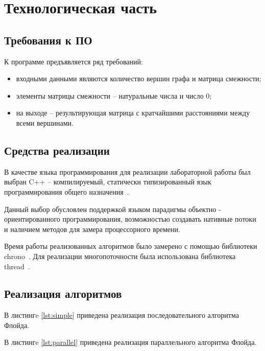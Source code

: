 \chapter{Технологическая часть}

\section{Требования к ПО}

К программе предъявляется ряд требований:
\begin{itemize}[label*=---]
	\item входными данными являются количество вершин графа и матрица смежности;
	\item элементы матрицы смежности -- натуральные числа и число 0;
	\item на выходе -- результирующая матрица с кратчайшими расстояниями между всеми вершинами.
\end{itemize}

\section{Средства реализации}

В качестве языка программирования для реализации лабораторной работы был выбран C++ -- компилируемый, статически типизированный язык программирования общего назначения~\cite{cpp}. 

Данный выбор обусловлен поддержкой языком парадигмы объектно - ориентированного программирования, возможностью создавать нативные потоки и наличием методов для замера процессорного времени.

Время работы реализованных алгоритмов было замерено с помощью библиотеки chrono~\cite{chrono}. Для реализации многопоточности была использована библиотека thread~\cite{thread}.
\pagebreak
\section{Реализация алгоритмов}
В листингe \ref{lst:simple} приведена реализация последовательного алгоритма Флойда.

\pagebreak
В листингe \ref{lst:parallel} приведена реализация параллельного алгоритма Флойда.


